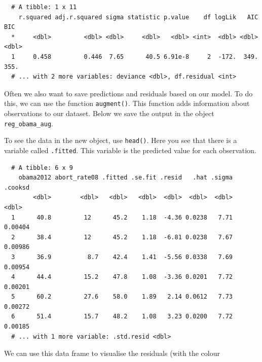 \documentclass[12pt,oneside]{reedthesis}
\theoremstyle{definition}
\theoremstyle{definition}
\theoremstyle{definition}
\theoremstyle{remark}
\begin{document}
  \begin{Shaded}
  \begin{Highlighting}[]
  \end{Highlighting}
  \end{Shaded}
  \begin{verbatim}
  # A tibble: 1 x 11
    r.squared adj.r.squared sigma statistic p.value    df logLik   AIC   BIC
  *     <dbl>         <dbl> <dbl>     <dbl>   <dbl> <int>  <dbl> <dbl> <dbl>
  1     0.458         0.446  7.65      40.5 6.91e-8     2  -172.  349.  355.
  # ... with 2 more variables: deviance <dbl>, df.residual <int>
  \end{verbatim}
  Often we also want to save predictions and residuals based on our model.
  To do this, we can use the function \texttt{augment()}. This function
  adds information about observations to our dataset. Below we save the
  output in the object \texttt{reg\_obama\_aug}.
  \begin{Shaded}
  \begin{Highlighting}[]
  \StringTok{ }
  \end{Highlighting}
  \end{Shaded}
  To see the data in the new object, use \texttt{head()}. Here you see
  that there is a variable called \texttt{.fitted}. This variable is the
  predicted value for each observation.
  \begin{Shaded}
  \begin{Highlighting}[]
  \end{Highlighting}
  \end{Shaded}
  \begin{verbatim}
  # A tibble: 6 x 9
    obama2012 abort_rate08 .fitted .se.fit .resid   .hat .sigma .cooksd
        <dbl>        <dbl>   <dbl>   <dbl>  <dbl>  <dbl>  <dbl>   <dbl>
  1      40.8         12      45.2    1.18  -4.36 0.0238   7.71 0.00404
  2      38.4         12      45.2    1.18  -6.81 0.0238   7.67 0.00986
  3      36.9          8.7    42.4    1.41  -5.56 0.0338   7.69 0.00954
  4      44.4         15.2    47.8    1.08  -3.36 0.0201   7.72 0.00201
  5      60.2         27.6    58.0    1.89   2.14 0.0612   7.73 0.00272
  6      51.4         15.7    48.2    1.08   3.23 0.0200   7.72 0.00185
  # ... with 1 more variable: .std.resid <dbl>
  \end{verbatim}
  We can use this data frame to visualise the residuals (with the colour
\end{document}
